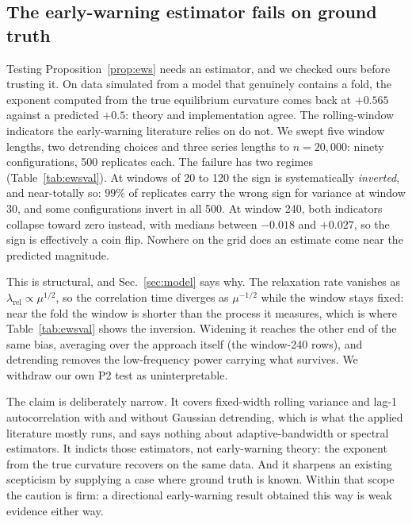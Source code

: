 \documentclass[conference]{IEEEtran}
\begin{document}
\subsection{The early-warning estimator fails on ground truth}
Testing Proposition~\ref{prop:ews} needs an estimator, and we checked ours
before trusting it. On data simulated from a model that
genuinely contains a fold, the exponent computed from the true equilibrium
curvature comes back at $+0.565$ against a predicted $+0.5$: theory and
implementation agree. The rolling-window indicators the early-warning literature
relies on \cite{scheffer2009,dakos2012} do not. We swept five window lengths,
two detrending choices and three series lengths to $n=20{,}000$: ninety
configurations, 500 replicates each. The failure has two regimes
(Table~\ref{tab:ewsval}). At windows of 20 to 120 the sign is systematically
\emph{inverted}, and near-totally so: $99\%$ of replicates carry the wrong
sign for variance at window 30, and some configurations invert in all 500. At
window 240, both indicators collapse toward zero instead, with medians between
$-0.018$ and $+0.027$, so the sign is effectively a coin flip.
Nowhere on the grid does an estimate come near the predicted magnitude.

This is structural, and Sec.~\ref{sec:model} says why. The relaxation rate
vanishes as $\lambda_{\text{rel}}\propto\mu^{1/2}$, so the correlation time
diverges as $\mu^{-1/2}$ while the window stays fixed: near the fold the window
is shorter than the process it measures, which is where
Table~\ref{tab:ewsval} shows the inversion. Widening it reaches the other end
of the same bias, averaging over the approach itself (the window-240 rows), and
detrending removes the low-frequency power carrying what survives. We
withdraw our own P2 test as uninterpretable.

The claim is deliberately narrow. It covers fixed-width rolling variance and lag-1 autocorrelation with and without
Gaussian detrending, which is what the applied literature mostly runs, and says
nothing about adaptive-bandwidth or spectral estimators. It indicts those
estimators, not early-warning theory: the exponent from the true curvature
recovers on the same data. And it sharpens an existing scepticism
\cite{ditlevsen2010,boettiger2012} by supplying a case where ground truth is
known. Within that scope the caution is firm: a directional early-warning
result obtained this way is weak evidence either way.
\end{document}

